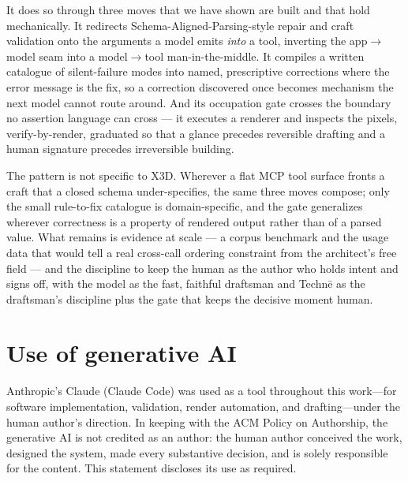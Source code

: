 \documentclass[sigconf,nonacm,screen,anonymous]{acmart}
\begin{document}
It does so through three moves that we have shown are built and that hold mechanically. It redirects Schema-Aligned-Parsing-style repair and craft validation onto the arguments a model emits \emph{into} a tool, inverting the app$\rightarrow$model seam into a model$\rightarrow$tool man-in-the-middle. It compiles a written catalogue of silent-failure modes into named, prescriptive corrections where the error message is the fix, so a correction discovered once becomes mechanism the next model cannot route around. And its occupation gate crosses the boundary no assertion language can cross --- it executes a renderer and inspects the pixels, verify-by-render, graduated so that a glance precedes reversible drafting and a human signature precedes irreversible building.

The pattern is not specific to X3D. Wherever a flat MCP tool surface fronts a craft that a closed schema under-specifies, the same three moves compose; only the small rule-to-fix catalogue is domain-specific, and the gate generalizes wherever correctness is a property of rendered output rather than of a parsed value. What remains is evidence at scale --- a corpus benchmark and the usage data that would tell a real cross-call ordering constraint from the architect's free field --- and the discipline to keep the human as the author who holds intent and signs off, with the model as the fast, faithful draftsman and Technē as the draftsman's discipline plus the gate that keeps the decisive moment human.

\section*{Use of generative AI}
Anthropic's Claude (Claude Code) was used as a tool throughout this work---for
software implementation, validation, render automation, and drafting---under the
human author's direction. In keeping with the ACM Policy on Authorship, the
generative AI is not credited as an author: the human author conceived the work,
designed the system, made every substantive decision, and is solely responsible
for the content. This statement discloses its use as required.

\balance
\end{document}

